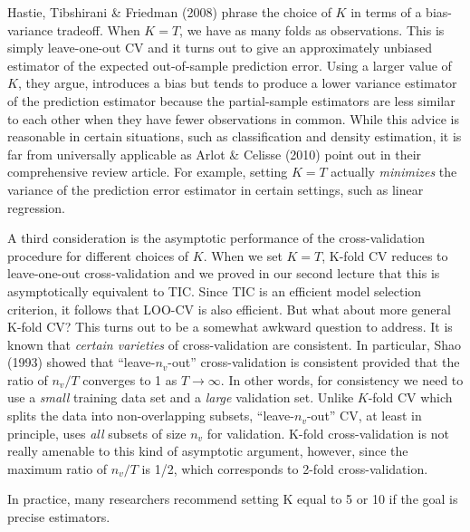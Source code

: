 \documentclass[12pt]{article}
\theoremstyle{definition}
\begin{document}
Hastie, Tibshirani \& Friedman (2008) phrase the choice of $K$ in terms of a bias-variance tradeoff. When $K = T$, we have as many folds as observations. This is simply leave-one-out CV and it turns out to give an approximately unbiased estimator of the expected out-of-sample prediction error. Using a larger value of $K$, they argue, introduces a bias but tends to produce a lower variance estimator of the prediction estimator because the partial-sample estimators are less similar to each other when they have fewer observations in common. While this advice is reasonable in certain situations, such as classification and density estimation, it is far from universally applicable as Arlot \& Celisse (2010) point out in their comprehensive review article. For example, setting $K=T$ actually \emph{minimizes} the variance of the prediction error estimator in certain settings, such as linear regression.

A third consideration is the asymptotic performance of the cross-validation procedure for different choices of $K$. When we set $K = T$, K-fold CV reduces to leave-one-out cross-validation and we proved in our second lecture that this is asymptotically equivalent to TIC. Since TIC is an efficient model selection criterion, it follows that LOO-CV is also efficient. But what about more general K-fold CV? This turns out to be a somewhat awkward question to address. It is known that \emph{certain varieties} of cross-validation are consistent. In particular, Shao (1993) showed that ``leave-$n_v$-out'' cross-validation is consistent provided that the ratio of $n_v/T$ converges to 1 as $T\rightarrow \infty$. In other words, for consistency we need to use a \emph{small} training data set and a \emph{large} validation set. Unlike $K$-fold CV which splits the data into non-overlapping subsets, ``leave-$n_v$-out'' CV, at least in principle, uses \emph{all} subsets of size $n_v$ for validation. K-fold cross-validation is not really amenable to this kind of asymptotic argument, however, since the maximum ratio of $n_v/T$ is 1/2, which corresponds to 2-fold cross-validation. 

In practice, many researchers recommend setting K equal to 5 or 10 if the goal is precise estimators.
\end{document}
